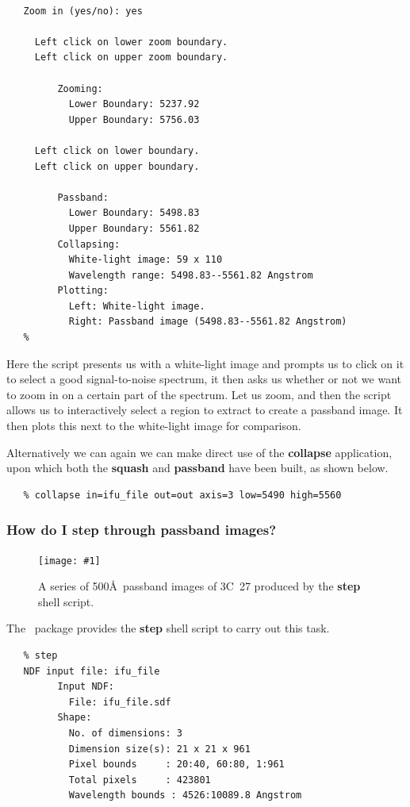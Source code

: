\documentclass[twoside,11pt]{article}
\newcommand{\htmladdimg}[1]{}
\newcommand{\xref}[3]{#1}
\newcommand{\myfig} [5] {
  \begin{figure}
    \centering\texttt{[image: \#1]}
    \typeout{#1 inserted on page \arabic{page}}
    \caption{\label{#4}#5}
  \end{figure}
  }
\newcommand{\myfig}[5]{
    \label{#4} \htmladdimg{#3}\\
    Figure: #5\\
    }
\begin{document}
\begin{\htmlonly}
{\begin{verbatim}
 
   Zoom in (yes/no): yes
 
     Left click on lower zoom boundary.
     Left click on upper zoom boundary.
 
         Zooming:
           Lower Boundary: 5237.92
           Upper Boundary: 5756.03
 
     Left click on lower boundary.
     Left click on upper boundary.
 
         Passband:
           Lower Boundary: 5498.83
           Upper Boundary: 5561.82
         Collapsing:
           White-light image: 59 x 110
           Wavelength range: 5498.83--5561.82 Angstrom
         Plotting:
           Left: White-light image.
           Right: Passband image (5498.83--5561.82 Angstrom)
   %
\end{verbatim}\normalsize

Here the script presents us with a white-light image and prompts us to
click on it to select a good signal-to-noise spectrum, it then asks us
whether or not we want to zoom in on a certain part of the spectrum.
Let us zoom, and then the script allows us to interactively select a
region to extract to create a passband image.  It then plots this next
to the white-light image for comparison.

Alternatively we can again we can make direct use of the {\bf collapse}
application, upon which both the \xref{{\bf squash}}{sun237}{squash}
and \xref{{\bf passband}}{sun237}{passband} have been built, as shown
below.

\small\begin{verbatim}
   % collapse in=ifu_file out=out axis=3 low=5490 high=5560
\end{verbatim}\normalsize

\subsubsection{How do I step through passband images?}

\myfig{sc16_step.eps}{height=0.4\textheight}{sc16_step.gif}{sc16_step_fig}{A
series of 500\AA\ passband images of 3C~27 produced by the
{\bf step} shell script.} 

The \DATACUBE\ package provides the \xref{{\bf step}}{sun237}{step}
shell script to carry out this task.

\small\begin{verbatim}
   % step
   NDF input file: ifu_file
         Input NDF:
           File: ifu_file.sdf
         Shape:
           No. of dimensions: 3
           Dimension size(s): 21 x 21 x 961
           Pixel bounds     : 20:40, 60:80, 1:961
           Total pixels     : 423801
           Wavelength bounds : 4526:10089.8 Angstrom


\end{verbatim}}
\end{\htmlonly}
\end{document}

